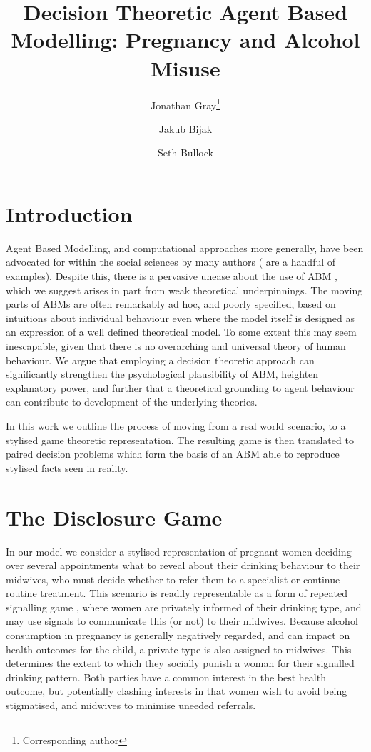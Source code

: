 \documentclass[twocolumn]{article}
\title{Decision Theoretic Agent Based Modelling: Pregnancy and Alcohol Misuse}
\author{Jonathan Gray\footnote{Corresponding author}}
\author{Jakub Bijak}
\author{Seth Bullock}
\affil{University of Southampton}
\date{\vspace{-5ex}}
\begin{document}
\maketitle
{}


\section{Introduction} %

Agent Based Modelling, and computational approaches more generally, have been advocated for within the social sciences by many authors (\citep{Axelrod1997, epstein1994growing, agent_zero, gilbert1999simulation, Macy2002a, Resnick,Silverman2011,Silverman2013} are a handful of examples). Despite this, there is a pervasive unease about the use of ABM \citep{Waldherr2013}, which we suggest arises in part from weak theoretical underpinnings. The moving parts of ABMs are often remarkably ad hoc, and poorly specified, based on intuitions about individual behaviour even where the model itself is designed as an expression of a well defined theoretical model. To some extent this may seem inescapable, given that there is no overarching and universal theory of human behaviour. We argue that employing a decision theoretic approach can significantly strengthen the psychological plausibility of ABM, heighten explanatory power, and further that a theoretical grounding to agent behaviour can contribute to development of the underlying theories.

In this work we outline the process of moving from a real world scenario, to a stylised game theoretic representation. The resulting game is then translated to paired decision problems which form the basis of an ABM able to reproduce stylised facts seen in reality.


\section{The Disclosure Game}\label{case} %

In our model we consider a stylised representation of pregnant women deciding over several appointments what to reveal about their drinking behaviour to their midwives, who must decide whether to refer them to a specialist or continue routine treatment. 
This scenario is readily representable as a form of repeated signalling game \citep{Kreps1987}, where women are privately informed of their drinking type, and may use signals to communicate this (or not) to their midwives. Because alcohol consumption in pregnancy is generally negatively regarded, and can impact on health outcomes for the child, a private type is also assigned to midwives. This determines the extent to which they socially punish a woman for their signalled drinking pattern. Both parties have a common interest in the best health outcome, but potentially clashing interests in that women wish to avoid being stigmatised, and midwives to minimise uneeded referrals.
\end{document}

